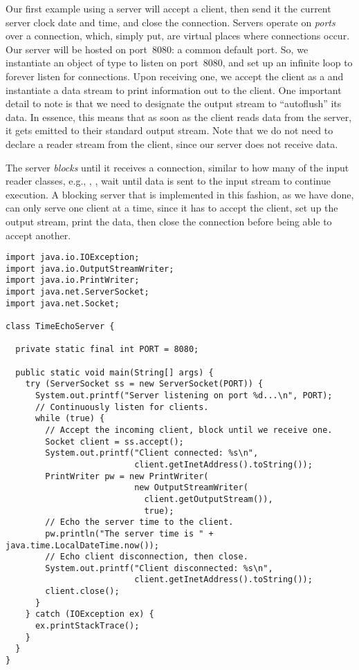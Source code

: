 Our first example using a server will accept a client, then send it the current server clock date and time, and close the connection. 
Servers operate on \emph{ports} over a connection, which, simply put, are virtual places where connections occur. 
Our server will be hosted on port~$8080$: a common default port. 
So, we instantiate an object of type  to listen on port~$8080$, and set up an infinite loop to forever listen for connections. 
Upon receiving one, we accept the client as a  and instantiate a data stream to print information out to the client. 
One important detail to note is that we need to designate the  output stream to ``autoflush'' its data. 
In essence, this means that as soon as the client reads data from the server, it gets emitted to their standard output stream. 
Note that we do not need to declare a reader stream from the client, since our server does not receive data.

The server \emph{blocks} until it receives a connection, similar to how many of the input reader classes, e.g., , , wait until data is sent to the input stream to continue execution. 
A blocking server that is implemented in this fashion, as we have done, can only serve one client at a time, since it has to accept the client, set up the output stream, print the data, then close the connection before being able to accept another.

\begin{lstlisting}[language=MyJava]
import java.io.IOException;
import java.io.OutputStreamWriter;
import java.io.PrintWriter;
import java.net.ServerSocket;
import java.net.Socket;

class TimeEchoServer {

  private static final int PORT = 8080;

  public static void main(String[] args) {
    try (ServerSocket ss = new ServerSocket(PORT)) {
      System.out.printf("Server listening on port %d...\n", PORT);
      // Continuously listen for clients.
      while (true) {
        // Accept the incoming client, block until we receive one.
        Socket client = ss.accept();
        System.out.printf("Client connected: %s\n", 
                          client.getInetAddress().toString());
        PrintWriter pw = new PrintWriter(
                          new OutputStreamWriter(
                            client.getOutputStream()), 
                            true);
        // Echo the server time to the client.
        pw.println("The server time is " + java.time.LocalDateTime.now());
        // Echo client disconnection, then close.
        System.out.printf("Client disconnected: %s\n", 
                          client.getInetAddress().toString());
        client.close();
      }
    } catch (IOException ex) { 
      ex.printStackTrace(); 
    }
  }
}
\end{lstlisting}

